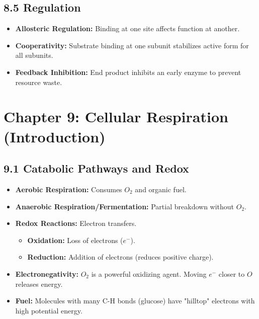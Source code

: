 \documentclass[11pt, a4paper]{article}
\begin{document}
\subsection*{8.5 Regulation}
\begin{itemize}
    \item \textbf{Allosteric Regulation:} Binding at one site affects function at another.
    \item \textbf{Cooperativity:} Substrate binding at one subunit stabilizes active form for all subunits.
    \item \textbf{Feedback Inhibition:} End product inhibits an early enzyme to prevent resource waste.
\end{itemize}

\section*{Chapter 9: Cellular Respiration (Introduction)}

\subsection*{9.1 Catabolic Pathways and Redox}
\begin{itemize}
    \item \textbf{Aerobic Respiration:} Consumes $O_2$ and organic fuel.
    \item \textbf{Anaerobic Respiration/Fermentation:} Partial breakdown without $O_2$.
    \item \textbf{Redox Reactions:} Electron transfers.
    \begin{itemize}
        \item \textbf{Oxidation:} Loss of electrons ($e^-$).
        \item \textbf{Reduction:} Addition of electrons (reduces positive charge).
    \end{itemize}
    \item \textbf{Electronegativity:} $O_2$ is a powerful oxidizing agent. Moving $e^-$ closer to $O$ releases energy.
    \item \textbf{Fuel:} Molecules with many C-H bonds (glucose) have "hilltop" electrons with high potential energy.
\end{itemize}
\end{document}
